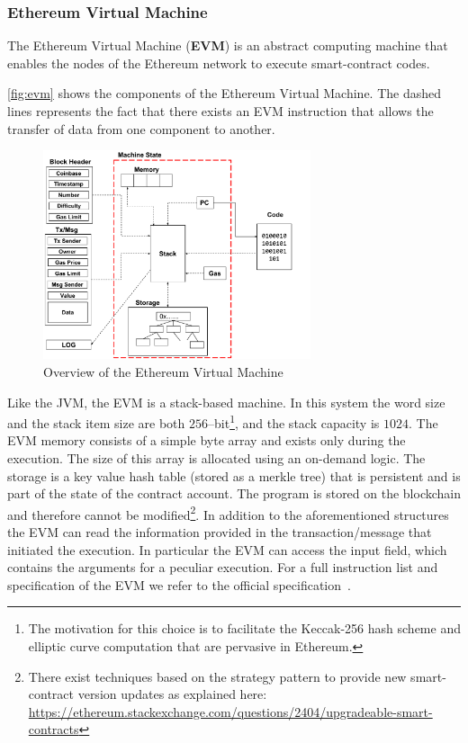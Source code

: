 \subsubsection{Ethereum Virtual Machine}
\label{sec:evm}
The Ethereum Virtual Machine (\textbf{EVM}) is an abstract computing machine
that enables the nodes of the Ethereum network to execute smart-contract
codes.


\autoref{fig:evm} shows the components of the Ethereum Virtual Machine.
The dashed lines represents the fact that there exists an EVM instruction
that allows the transfer of data from one component to another.
\begin{figure}
	\begin{center}
		\includegraphics[width=0.7\textwidth]
        {./res/img/evm-overview.pdf}
	\end{center}
	\caption{Overview of the Ethereum Virtual Machine}
	\label{fig:evm}
\end{figure}
Like the JVM, the EVM is a stack-based machine. In this system the word size
and the stack item size are both $256$--bit\footnote{The motivation
for this choice is to facilitate the Keccak-256 hash scheme and elliptic
curve computation that are pervasive in Ethereum.},
and the stack capacity is $1024$.
The EVM memory consists of a simple byte array and exists only during the
execution. The size of this array is allocated using an on-demand logic.
The storage is a key value hash table (stored as a merkle tree) that is
persistent and is part of the state of the contract account.
The program is stored on the blockchain and therefore cannot
be modified\footnote{There exist
techniques based on the strategy pattern to provide new smart-contract version
updates as explained here:
\url{https://ethereum.stackexchange.com/questions/2404/upgradeable-smart-contracts}}.
In addition to the aforementioned structures the EVM can read the information
provided in the transaction/message that initiated the execution. In particular
the EVM can access the input field, which contains the arguments for a peculiar
execution.
For a full instruction list and specification of the EVM
we refer to the official specification~\cite[Appendix H]{wood2018ethereum}.


